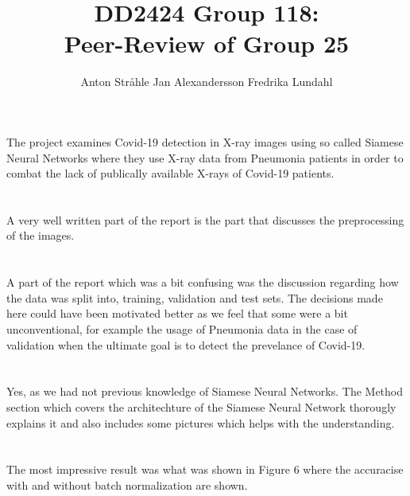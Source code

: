 \documentclass{article}
\title{DD2424 Group 118: \\ Peer-Review of Group 25}
\author{%
  Anton Stråhle \And Jan Alexandersson \And Fredrika Lundahl}
\begin{document}
	
\maketitle

\section{}

The project examines Covid-19 detection in X-ray images using so called Siamese Neural Networks where they use X-ray data from Pneumonia patients in order to combat the lack of publically available X-rays of Covid-19 patients.

\section{}

A very well written part of the report is the part that discusses the preprocessing of the images.

\section{}

A part of the report which was a bit confusing was the discussion regarding how the data was split into, training, validation and test sets. The decisions made here could have been motivated better as we feel that some were a bit unconventional, for example the usage of Pneumonia data in the case of validation when the ultimate goal is to detect the prevelance of Covid-19.

\section{}

Yes, as we had not previous knowledge of Siamese Neural Networks. The Method section which covers the architechture of the Siamese Neural Network thorougly explains it and also includes some pictures which helps with the understanding.

\section{}

The most impressive result was what was shown in Figure 6 where the accuracise with and without batch normalization are shown.

\section{}
\end{document}
